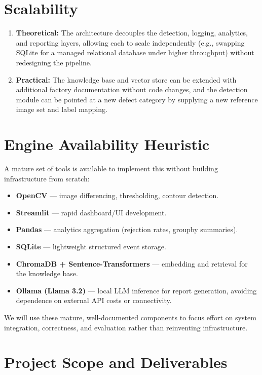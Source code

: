 \documentclass[11pt]{article}
\begin{document}
\section{Scalability}
\begin{enumerate}[leftmargin=*]
    \item \textbf{Theoretical:} The architecture decouples the detection, logging, analytics, and
    reporting layers, allowing each to scale independently (e.g., swapping SQLite for a managed
    relational database under higher throughput) without redesigning the pipeline.
    \item \textbf{Practical:} The knowledge base and vector store can be extended with additional
    factory documentation without code changes, and the detection module can be pointed at a new
    defect category by supplying a new reference image set and label mapping.
\end{enumerate}

\section{Engine Availability Heuristic}
A mature set of tools is available to implement this without building infrastructure from scratch:
\begin{itemize}[leftmargin=*]
    \item \textbf{OpenCV} --- image differencing, thresholding, contour detection.
    \item \textbf{Streamlit} --- rapid dashboard/UI development.
    \item \textbf{Pandas} --- analytics aggregation (rejection rates, groupby summaries).
    \item \textbf{SQLite} --- lightweight structured event storage.
    \item \textbf{ChromaDB + Sentence-Transformers} --- embedding and retrieval for the knowledge base.
    \item \textbf{Ollama (Llama 3.2)} --- local LLM inference for report generation, avoiding
    dependence on external API costs or connectivity.
\end{itemize}
We will use these mature, well-documented components to focus effort on system integration,
correctness, and evaluation rather than reinventing infrastructure.

\section{Project Scope and Deliverables}
\end{document}
